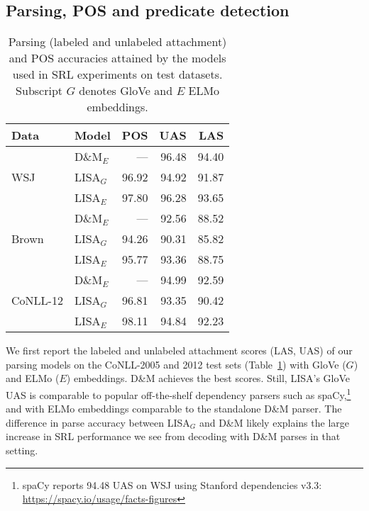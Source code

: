 \documentclass[11pt,a4paper]{article}
\begin{document}
\subsection{Parsing, POS and predicate detection \label{sec:parse-pos-results}}

\begin{table}
\begin{tabular}{llrrr} 		
Data & Model & POS & UAS & LAS \\ \hline \hline
\multirow{3}{*}{WSJ} & D\&M$_{E}$ & --- & 96.48 & 94.40 \\
& LISA$_{G}$ & 96.92 & 94.92 & 91.87 \\ 
& LISA$_{E}$ & 97.80 & 96.28 & 93.65 \\ \hline
\multirow{3}{*}{Brown} & D\&M$_{E}$ & --- & 92.56 & 88.52 \\
& LISA$_{G}$ & 94.26 & 90.31 & 85.82 \\ 
& LISA$_{E}$ & 95.77 & 93.36 & 88.75 \\ \hline
\multirow{3}{*}{CoNLL-12} & D\&M$_{E}$ & --- & 94.99 & 92.59 \\
& LISA$_{G}$ & 96.81 & 93.35 & 90.42 \\
& LISA$_{E}$ & 98.11 & 94.84 & 92.23 \\
\end{tabular}
\caption{\label{parsing-numbers} Parsing (labeled and unlabeled attachment) and POS accuracies attained by the models used in SRL experiments on test datasets. Subscript $G$ denotes GloVe and $E$ ELMo embeddings.}
\end{table}

We first report the labeled and unlabeled attachment scores (LAS, UAS) of our parsing models on the CoNLL-2005 and 2012 test sets (Table~\ref{parsing-numbers}) with GloVe ($G$) and ELMo ($E$) embeddings. D\&M achieves the best scores. Still, LISA's GloVe UAS is comparable to popular off-the-shelf dependency parsers such as spaCy,\footnote{spaCy reports 94.48 UAS on WSJ using Stanford dependencies v3.3: \protect\url{https://spacy.io/usage/facts-figures}} and with ELMo embeddings comparable to the standalone D\&M parser. The difference in parse accuracy between LISA$_G$ and D\&M likely explains the large increase in SRL performance we see from decoding with D\&M parses in that setting.
\end{document}
